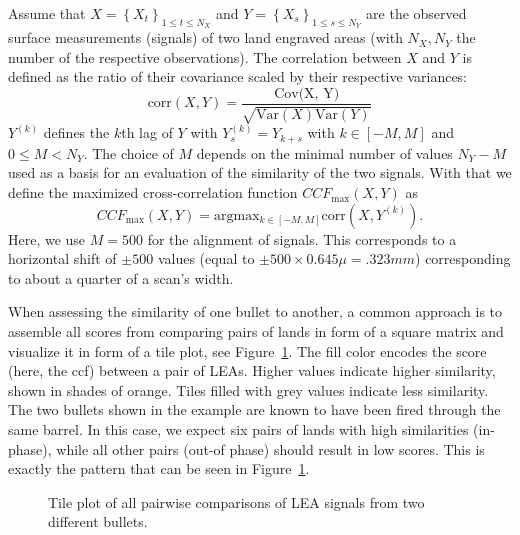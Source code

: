 \documentclass[
  number,
  preprint,
  5p,
  twocolumn]{elsarticle}
\begin{document}
Assume that \(X = \left\{X_t\right\}_{1 \le t \le N_X}\) and
\(Y = \left\{X_s\right\}_{1 \le s \le N_Y}\) are the observed surface
measurements (signals) of two land engraved areas (with \(N_X, N_Y\) the
number of the respective observations). The correlation between \(X\)
and \(Y\) is defined as the ratio of their covariance scaled by their
respective variances: \[
\text{corr} (X, Y) = \frac{\text{Cov(X, Y)}}{\sqrt{\text{Var}(X) \text{Var}(Y)}}
\] \(Y^{(k)}\) defines the \(k\)th lag of \(Y\) with
\(Y^{(k)}_s = Y_{k+s}\) with \(k \in [-M, M]\) and \(0 \le M < N_Y\).
The choice of \(M\) depends on the minimal number of values \(N_Y-M\)
used as a basis for an evaluation of the similarity of the two signals.
With that we define the maximized cross-correlation function
\(CCF_{\text{max}} (X, Y)\) as \[
CCF_{\text{max}} (X, Y) = \text{arg} \text{max}_{k \in [-M, M]} \text{corr}(X, Y^{(k)}).
\] Here, we use \(M=500\) for the alignment of signals. This corresponds
to a horizontal shift of \(\pm 500\) values (equal to
\(\pm 500 \times 0.645 \mu = .323 mm\)) corresponding to about a quarter
of a scan's width.

When assessing the similarity of one bullet to another, a common
approach is to assemble all scores from comparing pairs of lands in form
of a square matrix and visualize it in form of a tile plot, see
Figure~\ref{fig-land-matrix}. The fill color encodes the score (here,
the ccf) between a pair of LEAs. Higher values indicate higher
similarity, shown in shades of orange. Tiles filled with grey values
indicate less similarity. The two bullets shown in the example are known
to have been fired through the same barrel. In this case, we expect six
pairs of lands with high similarities (in-phase), while all other pairs
(out-of phase) should result in low scores. This is exactly the pattern
that can be seen in Figure~\ref{fig-land-matrix}.

\begin{figure}


\caption{\label{fig-land-matrix}Tile plot of all pairwise comparisons of
LEA signals from two different bullets.}

\end{figure}%
\end{document}
